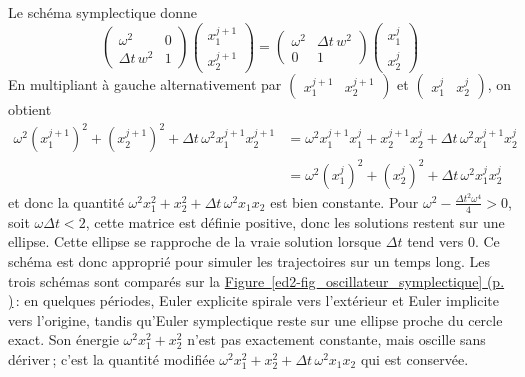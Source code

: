 Le schéma symplectique donne \[
\left( 
  \begin{matrix}
  \omega^2 & 0 \\
  {\Delta t}\, w^2 & 1
  \end{matrix}
\right)
\left( 
  \begin{matrix}
  x_1^{j+1}\\
  x_2^{j+1}
  \end{matrix}
\right)
=
\left( 
  \begin{matrix}
  \omega^2 & {\Delta t}\, w^2 \\
  0 & 1
  \end{matrix}
\right)
\left( 
  \begin{matrix}
  x_1^{j}\\
  x_2^{j}
  \end{matrix}
\right)
\] En multipliant à gauche alternativement par
\(\left( \begin{matrix}x_1^{j+1} & x_2^{j+1}\end{matrix}\right)\) et
\(\left( \begin{matrix}x_1^{j} & x_2^{j}\end{matrix}\right)\), on
obtient \begin{align*}
\omega^2 (x_1^{j+1})^2 + (x_2^{j+1})^2 +{\Delta t}\, \omega^2 x_1^{j+1}x_2^{j+1}
&= \omega^2 x_1^{j+1} x_1^j + x_2^{j+1}x_2^j +{\Delta t}\, \omega^2 x_1^{j+1}x_2^{j} \\
&= \omega^2 (x_1^{j})^2 + (x_2^{j})^2 +{\Delta t}\, \omega^2 x_1^{j}x_2^{j} 
\end{align*} et donc la quantité
\(\omega^2 x_1^2 + x_2^2 +{\Delta t}\, \omega^2 x_1x_2\) est bien
constante. Pour \(\omega^2-\frac{{\Delta t}^2 \omega^4}{4}>0\), soit
\(\omega {\Delta t}<2\), cette matrice est définie positive, donc les
solutions restent sur une ellipse. Cette ellipse se rapproche de la
vraie solution lorsque \({\Delta t}\) tend vers 0. Ce schéma est donc
approprié pour simuler les trajectoires sur un temps long. Les trois
schémas sont comparés sur la
\protect\hyperlink{ed2-fig_oscillateur_symplectique}{Figure~\ref*{ed2-fig_oscillateur_symplectique}
(p. \pageref*{ed2-fig_oscillateur_symplectique})}\,: en quelques
périodes, Euler explicite spirale vers l'extérieur et Euler implicite
vers l'origine, tandis qu'Euler symplectique reste sur une ellipse proche
du cercle exact. Son énergie \(\omega^2 x_1^2 + x_2^2\) n'est pas
exactement constante, mais oscille sans dériver\,; c'est la quantité
modifiée \(\omega^2 x_1^2 + x_2^2 +{\Delta t}\, \omega^2 x_1x_2\) qui
est conservée.


